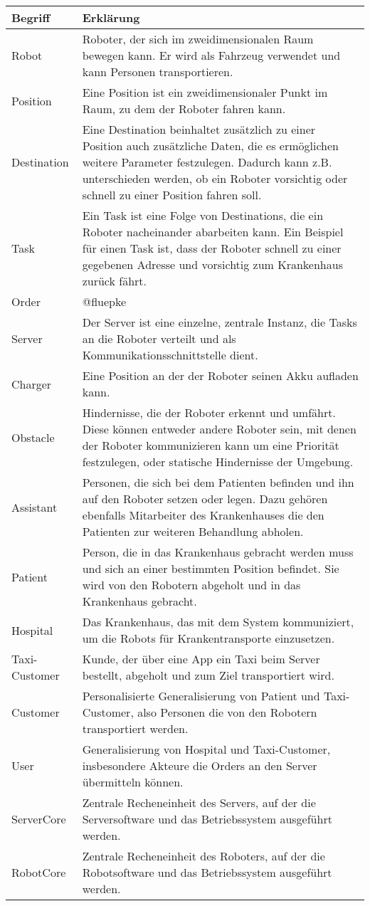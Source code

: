 	\begin{tabularx}{\textwidth}{|l|X|}
		\hline
		\textbf{Begriff} & \textbf{Erklärung}\\ \hline
		Robot & Roboter, der sich im zweidimensionalen Raum bewegen kann. Er wird als Fahrzeug verwendet und kann Personen transportieren.\\ \hline
		Position & Eine Position ist ein zweidimensionaler Punkt im Raum, zu dem der Roboter fahren kann.\\ \hline
		Destination & Eine Destination beinhaltet zusätzlich zu einer Position auch zusätzliche Daten, die es ermöglichen weitere Parameter festzulegen. 
		Dadurch kann z.B. unterschieden werden, ob ein Roboter vorsichtig oder schnell zu einer Position fahren soll. \\ \hline
		Task & Ein Task ist eine Folge von Destinations, die ein Roboter nacheinander abarbeiten kann. Ein Beispiel für einen Task ist, dass der Roboter schnell zu einer gegebenen Adresse und vorsichtig zum Krankenhaus zurück fährt.\\ \hline
		Order & @fluepke\\ \hline
		Server & Der Server ist eine einzelne, zentrale Instanz, die Tasks an die Roboter verteilt und als Kommunikationsschnittstelle dient.\\ \hline
		Charger & Eine Position an der der Roboter seinen Akku aufladen kann.\\ \hline
		Obstacle & Hindernisse, die der Roboter erkennt und umfährt. Diese können
		entweder andere Roboter sein, mit denen der Roboter kommunizieren kann
		um eine Priorität festzulegen, oder statische Hindernisse der
		Umgebung.\\ \hline
		Assistant & Personen, die sich bei dem Patienten befinden und ihn auf den Roboter setzen oder legen.
		 Dazu gehören ebenfalls Mitarbeiter des Krankenhauses die den Patienten zur weiteren Behandlung abholen.\\ \hline
		Patient & Person, die in das Krankenhaus gebracht werden muss und sich an einer bestimmten Position befindet. 
		Sie wird von den Robotern abgeholt und in das Krankenhaus gebracht.\\ \hline
		Hospital & Das Krankenhaus, das mit dem System kommuniziert, um die Robots für Krankentransporte einzusetzen. \\ \hline
		Taxi-Customer & Kunde, der über eine App ein Taxi beim Server bestellt, abgeholt und zum Ziel transportiert wird.\\ \hline
		Customer & Personalisierte Generalisierung von Patient und Taxi-Customer, also Personen die von den Robotern transportiert werden.\\ \hline
		User & Generalisierung von Hospital und Taxi-Customer, insbesondere Akteure die Orders an den Server übermitteln können.\\ \hline
		ServerCore & Zentrale Recheneinheit des Servers, auf der die Serversoftware und das Betriebssystem ausgeführt werden.\\ \hline
		RobotCore & Zentrale Recheneinheit des Roboters, auf der die Robotsoftware und das Betriebssystem ausgeführt werden.\\ \hline
	\end{tabularx}
